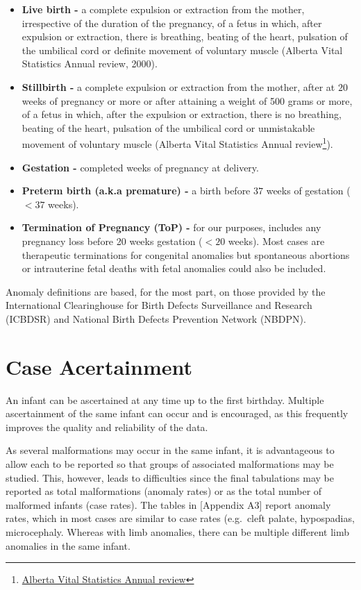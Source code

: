 \documentclass[
]{krantz}
\begin{document}
\begin{itemize}
\item
  \textbf{Live birth -} a complete expulsion or extraction from the mother, irrespective of the duration of the pregnancy, of a fetus in which, after expulsion or extraction, there is breathing, beating of the heart, pulsation of the umbilical cord or definite movement of voluntary muscle (Alberta Vital Statistics Annual review, 2000).
\item
  \textbf{Stillbirth -} a complete expulsion or extraction from the mother, after at \(20\) weeks of pregnancy or more or after attaining a weight of 500 grams or more, of a fetus in which, after the expulsion or extraction, there is no breathing, beating of the heart, pulsation of the umbilical cord or unmistakable movement of voluntary muscle (Alberta Vital Statistics Annual review\footnote{ \href{https://open.alberta.ca/publications/1485-3809}{Alberta Vital Statistics Annual review}}).
\item
  \textbf{Gestation -} completed weeks of pregnancy at delivery.
\item
  \textbf{Preterm birth (a.k.a premature) -} a birth before \(37\) weeks of gestation (\(< 37\) weeks).
\item
  \textbf{Termination of Pregnancy (ToP) -} for our purposes, includes any pregnancy loss before 20 weeks gestation (\(< 20\) weeks). Most cases are therapeutic terminations for congenital anomalies but spontaneous abortions or intrauterine fetal deaths with fetal anomalies could also be included.
\end{itemize}

Anomaly definitions are based, for the most part, on those provided by the International Clearinghouse for Birth Defects Surveillance and Research (ICBDSR) and National Birth Defects Prevention Network (NBDPN).

\hypertarget{section-12}{%
\section{Case Acertainment}\label{section-12}}

An infant can be ascertained at any time up to the first birthday. Multiple ascertainment of the same infant can occur and is encouraged, as this frequently improves the quality and reliability of the data.

As several malformations may occur in the same infant, it is advantageous to allow each to be reported so that groups of associated malformations may be studied. This, however, leads to difficulties since the final tabulations may be reported as total malformations (anomaly rates) or as the total number of malformed infants (case rates). The tables in {[}Appendix A3{]} report anomaly rates, which in most cases are similar to case rates (e.g.~cleft palate, hypospadias, microcephaly. Whereas with limb anomalies, there can be multiple different limb anomalies in the same infant.
\end{document}
